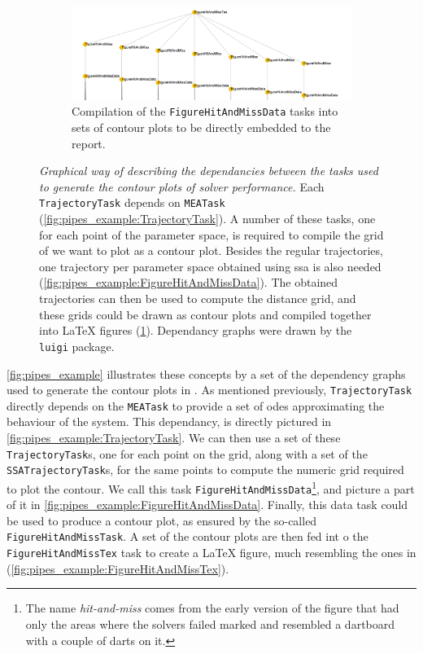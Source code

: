 \begin{figure}
    ~
    \begin{subfigure}[t]{\textwidth}
        \includegraphics[width=\textwidth]{images/FigureHitAndMissTex.png}
        \caption{Compilation of the {\tt FigureHitAndMissData} tasks into sets of contour plots to be directly embedded to the report.}
        \label{fig:pipes_example:FigureHitAndMissTex}
    \end{subfigure}
    \caption{\emph{Graphical way of describing the dependancies between the tasks used to generate the contour plots of solver performance.} 
    Each  \texttt{TrajectoryTask} depends on \texttt{MEATask} (\ref{fig:pipes_example:TrajectoryTask}).
    A number of these tasks, one for each point of the parameter space, is required to compile the grid of we want to plot as a contour plot.
    Besides the regular trajectories, one trajectory per parameter space obtained using \acrlong{ssa} is also needed (\ref{fig:pipes_example:FigureHitAndMissData}).
    The obtained trajectories can then be used to compute the distance grid, and these grids could be drawn as contour plots and compiled together into \LaTeX{} figures (\ref{fig:pipes_example:FigureHitAndMissTex}).
    Dependancy graphs were drawn by the {\tt luigi} package. }
    \label{fig:pipes_example}
\end{figure}

\autoref{fig:pipes_example} illustrates these concepts by a set of the dependency graphs used to generate the contour plots in .
As mentioned previously, \verb"TrajectoryTask" directly depends on the \verb"MEATask" to provide a set of \glspl{ode} approximating the behaviour of the system. 
This dependancy, is directly pictured in \autoref{fig:pipes_example:TrajectoryTask}. 
We can then use a set of these \verb"TrajectoryTask"s, one for each point on the grid, along with a set of the \verb"SSATrajectoryTask"s, for the same points to compute the numeric grid required to plot the contour. We call this task \verb"FigureHitAndMissData"\footnote{The name \emph{hit-and-miss} comes from the early version of the figure that had only the areas where the solvers failed marked and resembled a dartboard with a couple of darts on it.}, and picture a part of it in \autoref{fig:pipes_example:FigureHitAndMissData}. 
Finally, this data task could be used to produce a contour plot, as ensured by the so-called \verb"FigureHitAndMissTask". 
A set of the contour plots are then fed int o the \verb"FigureHitAndMissTex" task to create a \LaTeX{} figure, much resembling the ones in  (\autoref{fig:pipes_example:FigureHitAndMissTex}).

